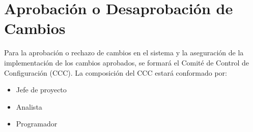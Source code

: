 \section{Aprobación o Desaprobación de Cambios}
\label{intro}
Para la aprobación o rechazo de cambios en el sistema y la aseguración de la implementación de los cambios
aprobados, se formará el Comité de Control de Configuración (CCC).
La composición del CCC estará conformado por:
\begin{itemize}
\item Jefe de proyecto
\item Analista 
\item Programador
\end{itemize}



\cleardoublepage